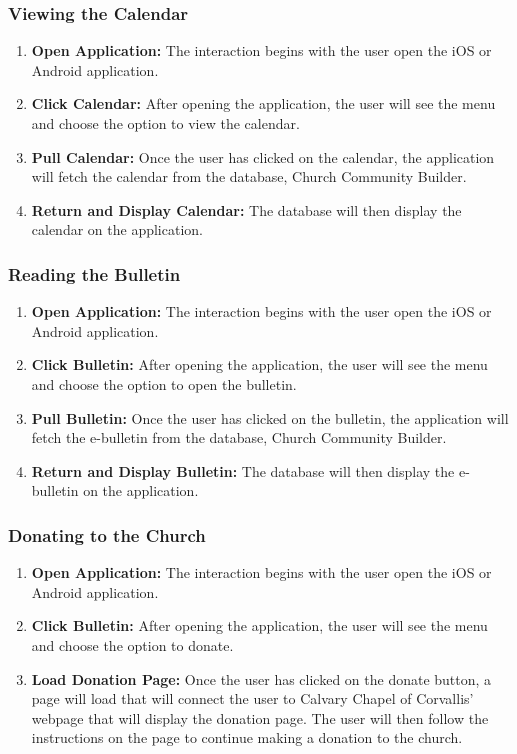 \documentclass[letterpaper,10pt,draftclsnofoot,onecolumn,titlepage]{IEEEtran}
\begin{document}
			\subsubsection{Viewing the Calendar}
				\begin{enumerate}
					\item \textbf{Open Application:} The interaction begins with the user open the iOS or Android application.
					\item \textbf{Click Calendar:} After opening the application, the user will see the menu and choose the option to view the calendar.
					\item \textbf{Pull Calendar:} Once the user has clicked on the calendar, the application will fetch the calendar from the database, Church Community Builder.
					\item \textbf{Return and Display Calendar:} The database will then display the calendar on the application.
				\end{enumerate}

			\subsubsection{Reading the Bulletin}
				\begin{enumerate}
					\item \textbf{Open Application:} The interaction begins with the user open the iOS or Android application.
					\item \textbf{Click Bulletin:} After opening the application, the user will see the menu and choose the option to open the bulletin.
					\item \textbf{Pull Bulletin:} Once the user has clicked on the bulletin, the application will fetch the e-bulletin from the database, Church Community Builder.
					\item \textbf{Return and Display Bulletin:} The database will then display the e-bulletin on the application.
				\end{enumerate}

			\subsubsection{Donating to the Church}
				\begin{enumerate}
					\item \textbf{Open Application:} The interaction begins with the user open the iOS or Android application.
					\item \textbf{Click Bulletin:} After opening the application, the user will see the menu and choose the option to donate.
					\item \textbf{Load Donation Page:} Once the user has clicked on the donate button, a page will load that will connect the user to Calvary Chapel of Corvallis' webpage that will display the donation page.
					The user will then follow the instructions on the page to continue making a donation to the church.
				\end{enumerate}
\end{document}
